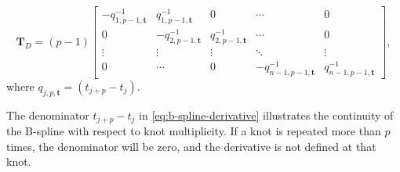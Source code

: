 \begin{equation}
    \mathbf T_D = (p-1) \begin{bmatrix}
        -q_{1,p-1,\mathbf{t}}^{-1} & q_{1,p-1,\mathbf{t}}^{-1} & 0 & \cdots & 0 \\
        0 & -q_{2,p-1,\mathbf{t}}^{-1} & q_{2,p-1,\mathbf{t}}^{-1} & \cdots & 0 \\
        \vdots & \vdots & \vdots & \ddots & \vdots \\
        0 & \cdots & 0 & -q_{n-1,p-1,\mathbf{t}}^{-1} & q_{n-1,p-1,\mathbf{t}}^{-1} 
    \end{bmatrix},
\end{equation}
where $q_{j,p,\mathbf{t}} = (t_{j+p}-t_j)$.


The denominator $t_{j+p}-t_j$ in \cref{eq:b-spline-derivative} illustrates the continuity of the B-spline with respect to knot multiplicity. If a knot is repeated more than $p$ times, the denominator will be zero, and the derivative is not defined at that knot.

